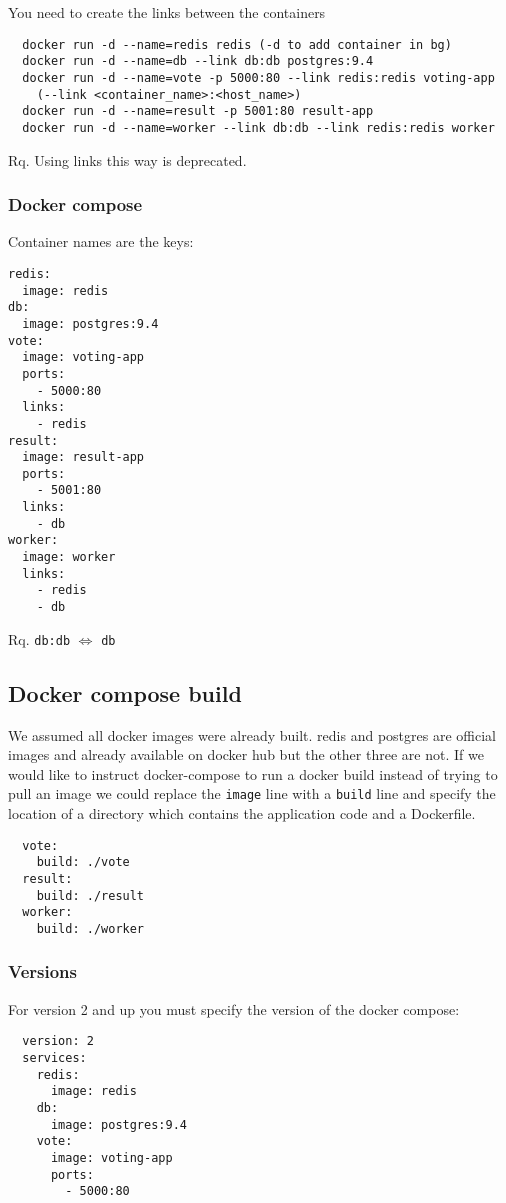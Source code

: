 \documentclass[french]{article}
\begin{document}
You need to create the links between the containers
\begin{verbatim}
  docker run -d --name=redis redis (-d to add container in bg)
  docker run -d --name=db --link db:db postgres:9.4
  docker run -d --name=vote -p 5000:80 --link redis:redis voting-app
    (--link <container_name>:<host_name>)
  docker run -d --name=result -p 5001:80 result-app
  docker run -d --name=worker --link db:db --link redis:redis worker
\end{verbatim}

Rq. Using links this way is deprecated.

\subsubsection{Docker compose}

Container names are the keys:
\begin{verbatim}
redis:
  image: redis
db:
  image: postgres:9.4
vote:
  image: voting-app
  ports:
    - 5000:80
  links:
    - redis
result:
  image: result-app
  ports:
    - 5001:80
  links:
    - db
worker:
  image: worker
  links:
    - redis
    - db
\end{verbatim}

Rq. \verb|db:db| $\Leftrightarrow$ \verb|db|

\subsection{Docker compose build}

We assumed all docker images were already built. redis and postgres are official images and already available on docker hub but the other three are not. If we would like to instruct docker-compose to run a docker build instead of trying to pull an image we could replace the \verb|image| line with a \verb|build| line and specify the location of a directory which contains the application code and a Dockerfile.
\begin{verbatim}
  vote:
    build: ./vote
  result:
    build: ./result
  worker:
    build: ./worker
\end{verbatim}

\subsubsection{Versions}

For version 2 and up you must specify the version of the docker compose:
\begin{verbatim}
  version: 2
  services:
    redis:
      image: redis
    db:
      image: postgres:9.4
    vote:
      image: voting-app
      ports:
        - 5000:80
\end{verbatim}
\end{document}
